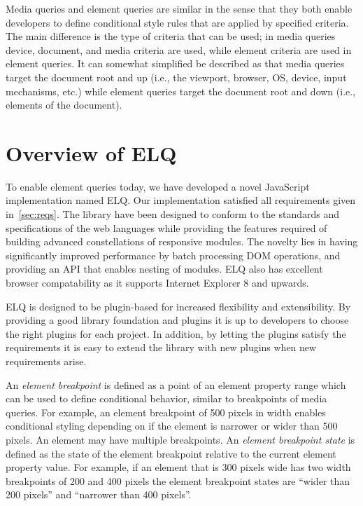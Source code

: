 \documentclass{acm_proc_article-sp}
\newcommand{\elq}{ELQ}
\begin{document}
  Media queries and element queries are similar in the sense that they both enable developers to define conditional style rules that are applied by specified criteria.
  The main difference is the type of criteria that can be used; in media queries device, document, and media criteria are used, while element criteria are used in element queries.
  It can somewhat simplified be described as that media queries target the document root and up (i.e., the viewport, browser, OS, device, input mechanisms, etc.) while element queries target the document root and down (i.e., elements of the document).

\section{Overview of \elq{}}
  To enable element queries today, we have developed a novel JavaScript implementation named \elq{}.
  Our implementation satisfied all requirements given in~\ref{sec:reqs}.
  The library have been designed to conform to the standards and specifications of the web languages while providing the features required of building advanced constellations of responsive modules.
  The novelty lies in having significantly improved performance by batch processing DOM operations, and providing an API that enables nesting of modules.
  \elq{} also has excellent browser compatability as it supports Internet Explorer 8 and upwards.

  \elq{} is designed to be plugin-based for increased flexibility and extensibility.
  By providing a good library foundation and plugins it is up to developers to choose the right plugins for each project.
  In addition, by letting the plugins satisfy the requirements it is easy to extend the library with new plugins when new requirements arise.

  An \emph{element breakpoint} is defined as a point of an element property range which can be used to define conditional behavior, similar to breakpoints of media queries.
  For example, an element breakpoint of 500 pixels in width enables conditional styling depending on if the element is narrower or wider than 500 pixels.
  An element may have multiple breakpoints.
  An \emph{element breakpoint state} is defined as the state of the element breakpoint relative to the current element property value.
  For example, if an element that is 300 pixels wide has two width breakpoints of 200 and 400 pixels the element breakpoint states are ``wider than 200 pixels'' and ``narrower than 400 pixels''.
\end{document}
